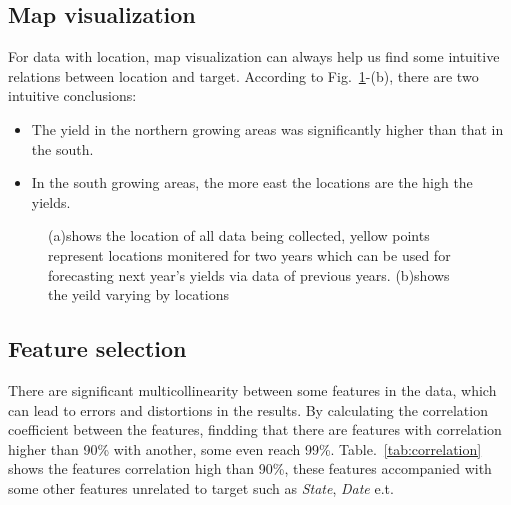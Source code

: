 \documentclass[conference]{IEEEtran}
\begin{document}
\subsection{Map visualization}
For data with location, map visualization can always help us find some intuitive relations between location and target. According to Fig.~\ref{fig:Map_visual}-(b), there are two intuitive conclusions:
\begin{itemize}
    \item The yield in the northern growing areas was significantly higher than that in the south. 
    \item In the south growing areas, the more east the locations are the high the yields.
\end{itemize}

\begin{figure}[!htb]
    \centering
    \hfill
  \label{fig:Map_visual} 
  \caption{(a)shows the location of all data being collected, yellow points represent locations monitered for two years which can be used for forecasting next year's yields via data of previous years. (b)shows the yeild varying by locations}
\end{figure}

\subsection{Feature selection}
There are significant multicollinearity between some features in the data, which can lead to errors and distortions in the results\cite{farrar1967multicollinearity}. By calculating the correlation coefficient between the features, findding that there are features with correlation higher than 90\% with another, some even reach 99\%. Table.~\ref{tab:correlation} shows the features correlation high than 90\%, these features accompanied with some other features unrelated to target such as \textit{State}, \textit{Date} e.t.
\end{document}
